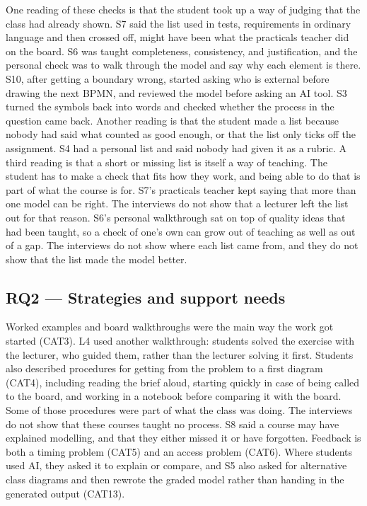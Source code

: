 One reading of these checks is that the student took up a way of judging that the class had already shown. S7 said the list used in tests, requirements in ordinary language and then crossed off, might have been what the practicals teacher did on the board. S6 was taught completeness, consistency, and justification, and the personal check was to walk through the model and say why each element is there. S10, after getting a boundary wrong, started asking who is external before drawing the next BPMN, and reviewed the model before asking an AI tool. S3 turned the symbols back into words and checked whether the process in the question came back. Another reading is that the student made a list because nobody had said what counted as good enough, or that the list only ticks off the assignment. S4 had a personal list and said nobody had given it as a rubric. A third reading is that a short or missing list is itself a way of teaching. The student has to make a check that fits how they work, and being able to do that is part of what the course is for. S7's practicals teacher kept saying that more than one model can be right. The interviews do not show that a lecturer left the list out for that reason. S6's personal walkthrough sat on top of quality ideas that had been taught, so a check of one's own can grow out of teaching as well as out of a gap. The interviews do not show where each list came from, and they do not show that the list made the model better.

\subsection{RQ2 --- Strategies and support needs}

Worked examples and board walkthroughs were the main way the work got started (CAT3). L4 used another walkthrough: students solved the exercise with the lecturer, who guided them, rather than the lecturer solving it first. Students also described procedures for getting from the problem to a first diagram (CAT4), including reading the brief aloud, starting quickly in case of being called to the board, and working in a notebook before comparing it with the board. Some of those procedures were part of what the class was doing. The interviews do not show that these courses taught no process. S8 said a course may have explained modelling, and that they either missed it or have forgotten. Feedback is both a timing problem (CAT5) and an access problem (CAT6). Where students used AI, they asked it to explain or compare, and S5 also asked for alternative class diagrams and then rewrote the graded model rather than handing in the generated output (CAT13).

